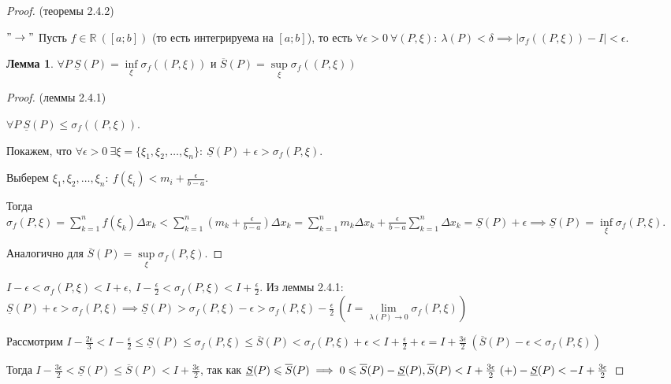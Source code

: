 \documentclass{report}
\theoremstyle{definition}
\newtheorem{lemma}{Лемма}[section]
\begin{document}
\begin{proof}
  (теоремы 2.4.2)

  $"\rightarrow"$ Пусть $f\in\mathbb{R} \ ([a;b])$ (то есть интегрируема на $[a;b]$), то есть $\forall \epsilon > 0 \
  \forall (P,\xi): \ \lambda (P) < \delta \implies | \sigma_{f} ((P,\xi)) - I | < \epsilon$.

  \begin{lemma}
    $\forall P \ \underline{S}(P) = \underset{\xi}{\inf} \sigma_{f}((P,\xi))$ и $\overline{S}(P)=\underset{\xi}{\sup}
    \sigma_{f}((P,\xi))$
  \end{lemma}

  \begin{proof}
    (леммы 2.4.1)

    $\forall P \ \underline{S}(P) \leqslant \sigma_{f}((P,\xi))$.

    Покажем, что $\forall \epsilon > 0 \ \exists \xi = \{\xi_{1},\xi_{2},\ldots,\xi_{n}\}: \ \underline{S}(P) + \epsilon
    > \sigma_{f}(P,\xi)$.

    Выберем $\xi_{1},\xi_{2},\ldots,\xi_{n}: \ f(\xi_{i}) < m_{i} + \frac{\epsilon}{b-a}$.

    Тогда $\sigma_{f}(P,\xi) = \sum_{k=1}^{n}f(\xi_{k})\Delta x_{k} < \sum_{k=1}^{n}(m_{k} + \frac{\epsilon}{b-a})
    \Delta x_{k} = \sum_{k=1}^{n}m_{k}\Delta x_{k} + \frac{\epsilon}{b-a}\sum_{k=1}^{n}\Delta x_{k} = \underline{S}(P)
    + \epsilon \implies \underline{S}(P) = \underset{\xi}{\inf}\sigma_{f}(P,\xi)$.

    Аналогично для $\overline{S}(P) = \underset{\xi}{\sup}\sigma_{f}(P,\xi)$.
  \end{proof}

  $I - \epsilon < \sigma_{f}(P,\xi) < I + \epsilon, \ I - \frac{\epsilon}{2} < \sigma_{f}(P,\xi) < I + \frac
  {\epsilon}{2}$. Из леммы 2.4.1: $\underline{S}(P) + \epsilon > \sigma_{f}(P,\xi) \implies \underline{S}(P) >
  \sigma_{f} (P,\xi) - \epsilon > \sigma_{f}(P,\xi) - \frac{\epsilon}{2} \ (I = \underset{\lambda
  (P)\rightarrow0}{\lim}\sigma_{f}(P,\xi))$

  Рассмотрим $I-\frac{2\epsilon}{3} < I - \frac{\epsilon}{2} \leqslant \underline{S}(P) \leqslant \sigma_{f}(P,\xi)
  \leqslant \overline{S}(P) < \sigma_{f}(P,\xi) + \epsilon < I + \frac{\epsilon}{2} + \epsilon = I + \frac{3\epsilon}{2}
  \ (\overline{S}(P) - \epsilon < \sigma_{f}(P,\xi))$

  Тогда $I - \frac{3\epsilon}{2} < \underline{S}(P) \leqslant \overline{S}(P) < I + \frac{3\epsilon}{2}$, так как
  $\underline{S}(P) \leqslant \overline{S}(P) \implies 0 \leqslant \overline{S}(P) - \underline{S}(P), \\
  \overline{S}(P) < I + \frac{3\epsilon}{2} \ (+)\\
  -\underline{S}(P) < -I + \frac{3\epsilon}{2}$


\end{proof}
\end{document}

